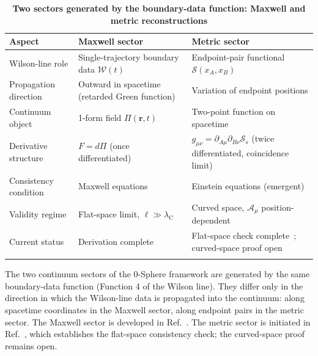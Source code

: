 \documentclass[%
 reprint, amsmath,amssymb, aps, prb, ]{revtex4-2}
\numberwithin{equation}{section}
\newcommand{\WL}{\mathcal{W}}
\newcommand{\lambdaC}{\lambda_{\mathrm{C}}}
\begin{document}
\begin{table}[t!]
\centering
\caption{\textbf{Two sectors generated by the boundary-data function: Maxwell and metric reconstructions}}
\label{tab:sectors}
\renewcommand{\arraystretch}{1.4}
\begin{tabular}{p{3.6cm}p{5.5cm}p{5.9cm}}
\toprule
\textbf{Aspect} & \textbf{Maxwell sector} & \textbf{Metric sector} \\
\midrule
Wilson-line role
& Single-trajectory boundary data $\WL(t)$
& Endpoint-pair functional $\mathcal{S}(x_A, x_B)$ \\
\addlinespace[0.3cm]
Propagation direction
& Outward in spacetime (retarded Green function)
& Variation of endpoint positions \\
\addlinespace[0.3cm]
Continuum object
& 1-form field $\Pi(\mathbf{r},t)$
& Two-point function on spacetime \\
\addlinespace[0.3cm]
Derivative structure
& $F = d\Pi$ (once differentiated)
& $g_{\mu\nu} = \partial_{A\mu}\partial_{B\nu}\mathcal{S}_s$ (twice differentiated, coincidence limit) \\
\addlinespace[0.3cm]
Consistency condition
& Maxwell equations
& Einstein equations (emergent) \\
\addlinespace[0.3cm]
Validity regime
& Flat-space limit, $\ell \gg \lambdaC$
& Curved space, $\mathcal{A}_\mu$ position-dependent \\
\addlinespace[0.3cm]
Current status
& Derivation complete~\cite{hanamura54}
& Flat-space check complete~\cite{hanamura51}; curved-space proof open \\
\addlinespace[0.2cm]
\bottomrule
\end{tabular}
\vspace{0.2cm}
\begin{minipage}{0.95\textwidth}
\justifying\footnotesize
The two continuum sectors of the 0-Sphere framework are generated by the same boundary-data function (Function 4 of the Wilson line). They differ only in the direction in which the Wilson-line data is propagated into the continuum: along spacetime coordinates in the Maxwell sector, along endpoint pairs in the metric sector. The Maxwell sector is developed in Ref.~\cite{hanamura54}. The metric sector is initiated in Ref.~\cite{hanamura51}, which establishes the flat-space consistency check; the curved-space proof remains open.
\end{minipage}
\end{table}
\end{document}

